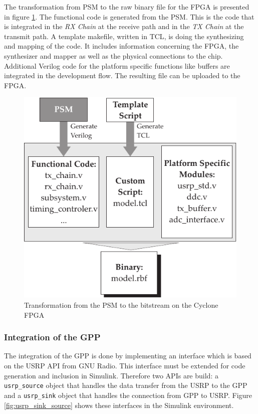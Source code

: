 

The transformation from \ac{PSM} to the raw binary file for the FPGA is presented in figure \ref{fig:codegener_FPGA_USRP}. The functional code is generated from the \ac{PSM}. This is the code that is integrated in the \emph{RX Chain} at the receive path and in the \emph{TX Chain} at the transmit path. A template makefile, written in \ac{TCL}, is doing the synthesizing and mapping of the code. It includes information concerning the FPGA, the synthesizer and mapper as well as the physical connections to the chip. Additional Verilog code for the platform specific functions like buffers are integrated in the development flow. The resulting file can be uploaded to the FPGA.  

\begin{figure}[htbp]
	\centering
		\includegraphics{../kapitel03/figures/codegener_FPGA_USRP.pdf}
	\caption{Transformation from the \ac{PSM} to the bitstream on the Cyclone FPGA}
	\label{fig:codegener_FPGA_USRP}
\end{figure}


\subsubsection{Integration of the GPP}
The integration of the GPP is done by implementing an interface which is based on the USRP API from GNU Radio. This interface must be extended for code generation and inclusion in Simulink. Therefore two APIs are build: a \texttt{usrp\_source} object that handles the data transfer from the USRP to the GPP and a \texttt{usrp\_sink} object that handles the connection from GPP to USRP. Figure \ref{fig:usrp_sink_source} shows these interfaces in the Simulink environment.

